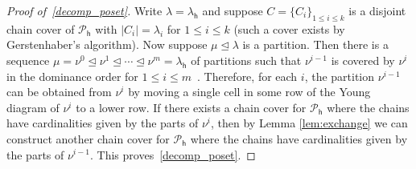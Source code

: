\documentclass[12pt,a4paper,reqno]{amsart}
\theoremstyle{plain}
\theoremstyle{definition}
\newcommand{\1}{\mathds{1}}
\newcommand{\hes}{\mathsf{h}}
\begin{document}
\begin{proof}[Proof of~\cref{decomp_poset}] 
  Write $\lambda=\lambda_\hes$ and suppose $C=\{C_i\}_{1\leq i\leq k}$ is a disjoint chain cover of $\mathcal{P}_\hes$ with $|C_i|=\lambda_i$ for $1\leq i\leq k$ (such a cover exists by Gerstenhaber's algorithm). Now suppose $\mu \trianglelefteq \lambda$ is a partition.  Then there is a sequence $\mu=\nu^0\trianglelefteq \nu^1\trianglelefteq \cdots \trianglelefteq \nu^m=\lambda_\hes$ of partitions such that $\nu^{i-1}$ is covered by $\nu^{i}$ in the dominance order for $1\leq i\leq m$~\cite[p. 9]{Macdonald}. Therefore, for each $i$, the partition $\nu^{i-1}$ can be obtained from $\nu^i$ by moving a single cell in some row of the Young diagram of $\nu^i$ to a lower row. If there exists a chain cover for $\mathcal{P}_\hes$ where the chains have cardinalities given by the parts of $\nu^{i}$, then by Lemma \ref{lem:exchange} we can construct another chain cover for $\mathcal{P}_\hes$ where the chains have cardinalities given by the parts of $\nu^{i-1}$. This proves~\cref{decomp_poset}. 
\end{proof} 
\end{document}
